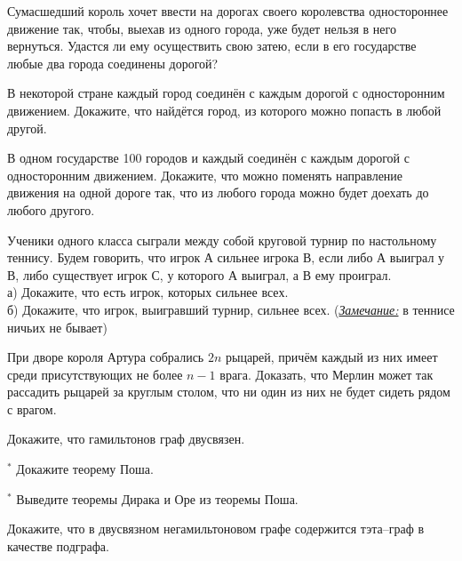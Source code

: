 \begin{thm}
    Сумасшедший король хочет ввести на дорогах своего королевства одностороннее движение так, чтобы, выехав из одного города, уже будет нельзя в него вернуться. Удастся ли ему осуществить свою затею, если в его государстве любые два города соединены дорогой?
\end{thm}

\begin{thm}
    В некоторой стране каждый город соединён с каждым дорогой с односторонним движением. Докажите, что найдётся город, из которого можно попасть в любой другой.
\end{thm}

\begin{thm}
    В одном государстве 100 городов и каждый соединён с каждым дорогой с односторонним движением. Докажите, что можно поменять направление движения на одной дороге так, что из любого города можно будет доехать до любого другого.
\end{thm}

\begin{thm}
    Ученики одного класса сыграли между собой круговой турнир по настольному теннису. Будем говорить, что игрок А сильнее игрока В, если либо А выиграл у В, либо существует игрок С, у которого А выиграл, а В ему проиграл.
    \\ а) Докажите, что есть игрок, которых сильнее всех.
    \\ б) Докажите, что игрок, выигравший турнир, сильнее всех. (\underline{\textit{Замечание:}} в теннисе ничьих не бывает)
\end{thm}


\begin{thm}
    При дворе короля Артура собрались $2n$ рыцарей, причём каждый из них имеет среди присутствующих не более $n - 1$ врага. Доказать, что Мерлин может так рассадить рыцарей за круглым столом, что ни один из них не будет сидеть рядом с врагом.
\end{thm}

\begin{thm}
    Докажите, что гамильтонов граф двусвязен.
\end{thm}

\begin{thm} $^*$
    Докажите теорему Поша.
\end{thm}

\begin{thm} $^*$
    Выведите теоремы Дирака и Оре из теоремы Поша.
\end{thm}

\begin{thm}
    Докажите, что в двусвязном негамильтоновом графе содержится тэта--граф в качестве подграфа.
\end{thm}